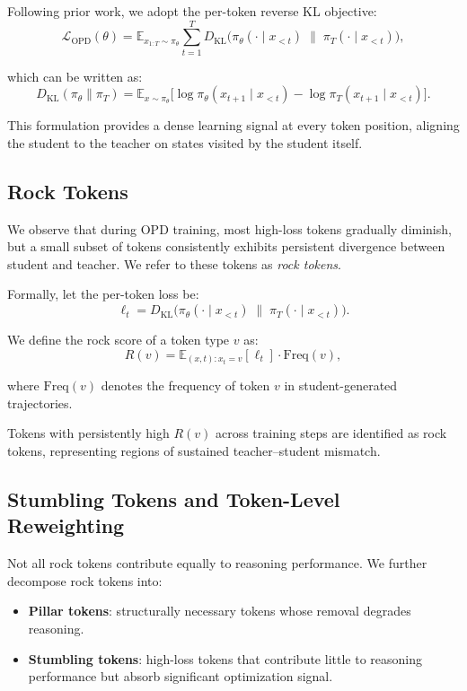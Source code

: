 \documentclass{article}
\begin{document}
Following prior work, we adopt the per-token reverse KL objective:
\begin{equation}
\mathcal{L}_{\text{OPD}}(\theta)
= \mathbb{E}_{x_{1:T} \sim \pi_\theta}
\sum_{t=1}^{T}
D_{\text{KL}}\!\big(
\pi_\theta(\cdot \mid x_{<t})
\;\|\;
\pi_T(\cdot \mid x_{<t})
\big),
\end{equation}

which can be written as:
\begin{equation}
D_{\text{KL}}(\pi_\theta \| \pi_T)
=
\mathbb{E}_{x \sim \pi_\theta}
\Big[
\log \pi_\theta(x_{t+1} \mid x_{<t})
-
\log \pi_T(x_{t+1} \mid x_{<t})
\Big].
\end{equation}

This formulation provides a dense learning signal at every token position, aligning the student to the teacher on states visited by the student itself.

\subsection{Rock Tokens}
\label{Preliminaries:Rock Tokens}
We observe that during OPD training, most high-loss tokens gradually diminish, but a small subset of tokens consistently exhibits persistent divergence between student and teacher. We refer to these tokens as \textit{rock tokens}.

Formally, let the per-token loss be:
\begin{equation}
\ell_t =
D_{\text{KL}}\!\big(
\pi_\theta(\cdot \mid x_{<t})
\;\|\;
\pi_T(\cdot \mid x_{<t})
\big).
\end{equation}

We define the rock score of a token type $v$ as:
\begin{equation}
R(v)
=
\mathbb{E}_{(x,t): x_t = v}
\left[
\ell_t
\right]
\cdot
\mathrm{Freq}(v),
\end{equation}

where $\mathrm{Freq}(v)$ denotes the frequency of token $v$ in student-generated trajectories.

Tokens with persistently high $R(v)$ across training steps are identified as rock tokens, representing regions of sustained teacher--student mismatch.

\subsection{Stumbling Tokens and Token-Level Reweighting}
\label{Preliminaries:Stumbling Tokens and Token-Level Reweighting}
Not all rock tokens contribute equally to reasoning performance. We further decompose rock tokens into:
\begin{itemize}
\item \textbf{Pillar tokens}: structurally necessary tokens whose removal degrades reasoning.
\item \textbf{Stumbling tokens}: high-loss tokens that contribute little to reasoning performance but absorb significant optimization signal.
\end{itemize}
\end{document}
